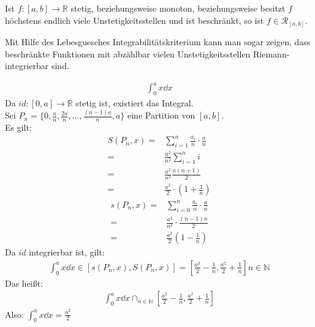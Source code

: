\begin{Korollar}{
	Ist $f:[a,b] \rightarrow \mathbb{R}$ stetig, beziehungsweise monoton, beziehungsweise 
	besitzt $f$ höchstens endlich viele Unstetigkeitsstellen und ist beschränkt, so ist 
	$f \in \mathcal{R}_{[a,b]}$.
}\end{Korollar}

\begin{Bemerkung}{
	Mit Hilfe des Lebesguesches Integrabilitätskriterium kann man 
	sogar zeigen, dass beschränkte Funktionen mit abzählbar vielen Unstetigkeitsstellen 
	Riemann-integrierbar sind.
}\end{Bemerkung}

\begin{Beispiel}{
	\begin{align*}
		\int_0^a x \dd{x}
	\end{align*}
	Da $id :[0,a] \rightarrow \mathbb{R}$ stetig ist, existiert das Integral. \\
	Sei $P_n =\{ 0, \frac{a}{n}, \frac{2a}{n}, \hdots, \frac{(n-1)a}{n}, a\}$ 
	eine Partition von $[a,b]$. \\
	Es gilt: 
	\begin{align*}
		S(P_n, x) = & \sum_{i =1} ^n \frac{a_i}{n} \cdot \frac{a}{n} \\
		= & \frac{a^2}{n^2} \sum_{i = 1}^n i \\
		= & \frac{a^2}{n^2} \frac{n(n+1)}{2} \\ 
		= & \frac{a^2}{2} \cdot \left( 1 + \frac{1}{n} \right)
	\end{align*}
	\begin{align*}
		s(P_n, x) = & \sum_{i = 0}^n \frac{a_i}{n} \cdot \frac{a}{n}  \\
		= & \frac{a^2}{n^2} \cdot \frac{(n-1)n}{2} \\
		= & \frac{a^2}{2}\left( 1 - \frac{1}{n} \right)
	\end{align*}
	Da $id$ integrierbar ist, gilt:
	\begin{align*}
		\int_0^a x \dd{x} \in \left[ s(P_n,x), S(P_n, x)\right] = 
		\left[\frac{a^2}{2}- \frac{1}{n}, \frac{a^2}{2}+\frac{1}{n}\right]
		n \in \mathbb{N}
	\end{align*}
	Das heißt:
	\begin{align*}
		\int_0^a x \dd{x} \cap_{n \in \mathbb{N}} \left[\frac{a^2}{2}- \frac{1}{n}, 
		\frac{a^2}{2}+\frac{1}{n}\right]
	\end{align*}
	Also: $\int_0^a x \dd{x} = \frac{a^2}{2}$
}\end{Beispiel}

